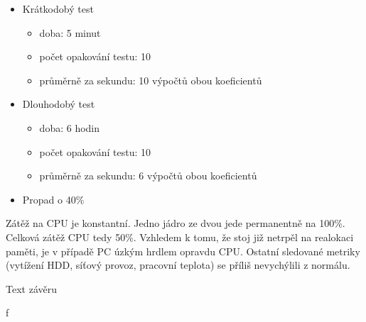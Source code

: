 \begin{itemize}
	\setlength{\parskip}{0pt}
	\setlength{\itemsep}{0pt}
	\item {Krátkodobý test}
	\begin{itemize}
		\setlength{\parskip}{0pt}
		\setlength{\itemsep}{0pt}
		\item {doba: 5 minut}
		\item {počet opakování testu: 10}
		\item {průměrně za sekundu: 10 výpočtů obou koeficientů}
	\end{itemize}
	\item {Dlouhodobý test}
	\begin{itemize}
		\setlength{\parskip}{0pt}
		\setlength{\itemsep}{0pt}
		\item {doba: 6 hodin}
		\item {počet opakování testu: 10}
		\item {průměrně za sekundu: 6 výpočtů obou koeficientů}
	\end{itemize}
	\item {Propad o 40\%}
\end{itemize}

Zátěž na CPU je konstantní. Jedno jádro ze dvou jede permanentně na 100\%. Celková zátěž CPU tedy 50\%. Vzhledem k tomu, že stoj již netrpěl na realokaci paměti, je v případě PC úzkým hrdlem opravdu CPU. Ostatní sledované metriky (vytížení HDD, síťový provoz, pracovní teplota) se příliš nevychýlili z normálu.






Text závěru


f